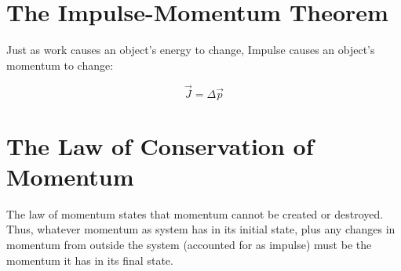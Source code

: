 	
	\section{The Impulse-Momentum Theorem}
	
	Just as work causes an object's energy to change, Impulse causes an object's momentum to change:
	
		\begin{mdframed}[backgroundcolor=orange!20!white]
		\begin{equation}
		\vec{J} = \Delta \vec{p} 
		\label{eqn:ImpulseMomentumTheorum}
		\end{equation}
	\end{mdframed}
	
	
	
	
	\section{The Law of Conservation of Momentum}
	
	The law of momentum states that momentum cannot be created or destroyed.  Thus, whatever momentum as system has in its initial state, plus any changes in momentum from outside the system (accounted for as impulse) must be the momentum it has in its final state.
	

		


	



